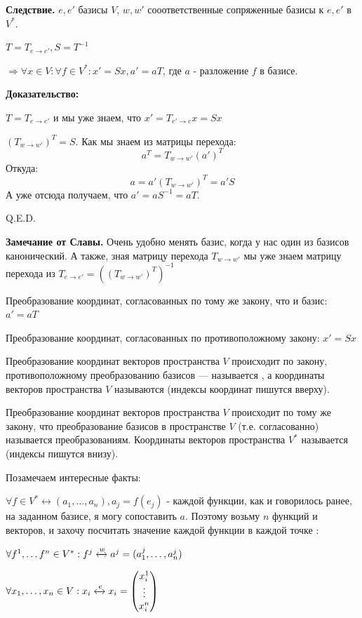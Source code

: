 \textbf{Следствие.} $e,e'$ базисы $V$, $w,w'$ сооответственные сопряженные базисы к $e,e'$ в $V^*$.

$T = T_{e\rightarrow e'}, S = T^{-1}$

$ \Rightarrow \forall x \in V: \forall f \in V^*:x' = Sx, a' = aT$, где $a$ - разложение $f$ в базисе.

\textbf{Доказательство:}    

$T=T_{e\rightarrow e'}$ и мы уже знаем, что $x' = T_{e'\rightarrow e}x = Sx$ 

$(T_{w\rightarrow w'})^T = S$. Как мы знаем из матрицы перехода:
$$a^T = T_{w\rightarrow w'}(a')^T$$ 
Откуда:
$$a = a'(T_{w\rightarrow w'})^T = a'S$$
А уже отсюда получаем, что $a' = aS^{-1} = aT$.

\hfill Q.E.D.

\textbf{Замечание от Славы.} Очень удобно менять базис, когда у нас один из базисов канонический. А также, зная матрицу перехода $T_{w\rightarrow w'}$ мы уже знаем матрицу перехода из $T_{e\rightarrow e'} =((T_{w\rightarrow w'})^T)^{-1} $


Преобразование координат, согласованных по тому же закону, что и базис:
$a' =a T$

Преобразование координат, согласованных по противоположному закону:
$x' = Sx$

 Преобразование координат векторов пространства $V$ происходит по закону, противоположному преобразованию базисов --- называется , а координаты векторов пространства $V$ называются  (индексы координат пишутся вверху).

 Преобразование координат векторов пространства $V$ происходит по тому же закону, что преобразование базисов в пространстве $V$ (т.е. согласованно) называется  преобразованиям.
Координаты векторов пространства $V^* $ называется  (индексы пишутся внизу).

Позамечаем интересные факты:

$\forall f \in V^* \leftrightarrow (a_1,\ldots, a_n), a_j = f(e_j)$ - каждой функции, как и говорилось ранее, на заданном базисе, я могу сопоставить $a$. Поэтому возьму $n$ функций и векторов, и захочу посчитать значение каждой функции в каждой точке : 

$\forall f^1, \ldots f^n \in V^*: f^j \xleftrightarrow{w} a^j = (a_1^j,\ldots , a_n^j)$

$\forall x_1, \ldots, x_n \in V: x_i \xleftrightarrow{e}x_i = \begin{pmatrix}
    x^1_i \\
    \vdots \\ 
    x^n_i
\end{pmatrix}$


